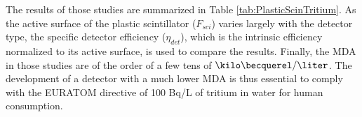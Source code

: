 The results of those studies are summarized in Table \ref{tab:PlasticScinTritium}. As the active surface of the plastic scintillator ($F_{sci}$) varies largely with the detector type, the specific detector efficiency ($\eta_{det}$), which is the intrinsic efficiency normalized to its active surface, is used to compare the results. Finally, the MDA in those studies are of the order of a few tens of $\kilo\becquerel/\liter$. The development of a detector with a much lower MDA is thus essential to comply with the EURATOM directive of 100 Bq/L of tritium in water for human consumption.